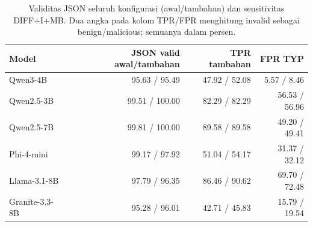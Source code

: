\begin{table}[t]
\centering\small
\caption{Validitas JSON seluruh konfigurasi (awal/tambahan) dan sensitivitas DIFF+I+MB. Dua angka pada kolom TPR/FPR menghitung invalid sebagai benign/malicious; semuanya dalam persen.}
\label{tab:sensitivity}
\begin{tabular}{lrrr}
\toprule
Model & JSON valid awal/tambahan & TPR tambahan & FPR TYP \\
\midrule
Qwen3-4B & 95.63 / 95.49 & 47.92 / 52.08 & 5.57 / 8.46 \\
Qwen2.5-3B & 99.51 / 100.00 & 82.29 / 82.29 & 56.53 / 56.96 \\
Qwen2.5-7B & 99.81 / 100.00 & 89.58 / 89.58 & 49.20 / 49.41 \\
Phi-4-mini & 99.17 / 97.92 & 51.04 / 54.17 & 31.37 / 32.12 \\
Llama-3.1-8B & 97.79 / 96.35 & 86.46 / 90.62 & 69.70 / 72.48 \\
Granite-3.3-8B & 95.28 / 96.01 & 42.71 / 45.83 & 15.79 / 19.54 \\
\bottomrule
\end{tabular}
\end{table}
